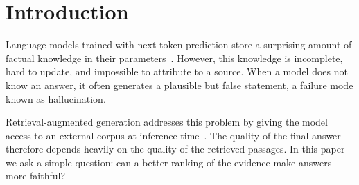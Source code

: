 \section{Introduction}
\label{sec:intro}
Language models trained with next-token prediction store a surprising amount of factual knowledge in their parameters~\citep{petroni2019lama}.
However, this knowledge is incomplete, hard to update, and impossible to attribute to a source.
When a model does not know an answer, it often generates a plausible but false statement, a failure mode known as hallucination.

Retrieval-augmented generation addresses this problem by giving the model access to an external corpus at inference time~\citep{lewis2020rag}.
The quality of the final answer therefore depends heavily on the quality of the retrieved passages. %
In this paper we ask a simple question: can a better ranking of the evidence make answers more faithful?
